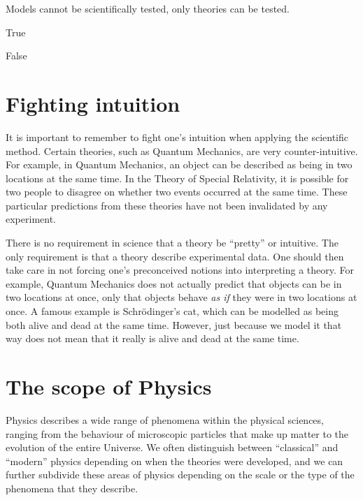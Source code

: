 \begin{checkpoint}
\begin{MCquestion}{Models cannot be scientifically tested, only theories can be tested.}
\item True
\item False \correct
\end{MCquestion}
\end{checkpoint}

\section{Fighting intuition}
It is important to remember to fight one's intuition when applying the scientific method. Certain theories, such as Quantum Mechanics, are very counter-intuitive. For example, in Quantum Mechanics, an object can be described as being in two locations at the same time. In the Theory of Special Relativity, it is possible for two people to disagree on whether two events occurred at the same time. These particular predictions from these theories have not been invalidated by any experiment.

There is no requirement in science that a theory be ``pretty'' or intuitive. The only requirement is that a theory describe experimental data. One should then take care in not forcing one's preconceived notions into interpreting a theory. For example, Quantum Mechanics does not actually predict that objects can be in two locations at once, only that objects behave \textit{as if} they were in two locations at once. A famous example is Schr\"odinger's cat, which can be modelled as being both alive and dead at the same time. However, just because we model it that way does not mean that it really is alive and dead at the same time. 

\section{The scope of Physics}
Physics describes a wide range of phenomena within the physical sciences, ranging from the behaviour of microscopic particles that make up matter to the evolution of the entire Universe. We often distinguish between ``classical'' and ``modern'' physics depending on when the theories were developed, and we can further subdivide these areas of physics depending on the scale or the type of the phenomena that they describe.

